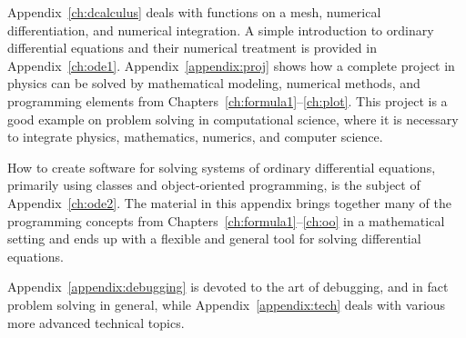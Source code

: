 Appendix~\ref{ch:dcalculus} deals with functions on a mesh,
numerical differentiation, and numerical integration.
A simple introduction to ordinary differential equations and their
numerical treatment is provided in Appendix~\ref{ch:ode1}.
Appendix~\ref{appendix:proj} shows how a complete project in physics
can be solved by mathematical modeling, numerical methods, and
programming elements from Chapters~\ref{ch:formula1}--\ref{ch:plot}.
This project is a
good example on problem solving in computational science, where it is
necessary to integrate physics, mathematics, numerics, and computer
science.

How to create software for solving systems of ordinary differential equations,
primarily using classes and object-oriented programming, is the subject of
Appendix~\ref{ch:ode2}. The material in this appendix brings together
many of the programming concepts from Chapters~\ref{ch:formula1}--\ref{ch:oo}
in a mathematical setting and ends up with a flexible and general
tool for solving differential equations.


Appendix~\ref{appendix:debugging} is devoted to the art of debugging,
and in fact problem solving in general, while
Appendix~\ref{appendix:tech} deals with various more advanced
technical topics.

